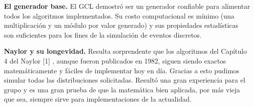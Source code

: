 \documentclass[a4paper, 11pt]{article}
\begin{document}
\textbf{El generador base.} El GCL demostró ser un generador confiable para
alimentar todos los algoritmos implementados. Su costo computacional es mínimo (una
multiplicación y un módulo por valor generado) y sus propiedades estadísticas son
suficientes para los fines de la simulación de eventos discretos.

\textbf{Naylor y su longevidad.} Resulta sorprendente que los algoritmos del Capítulo 4 del Naylor
[1] , aunque fueron publicados en 1982, siguen siendo exactos matemáticamente y fáciles de
implementar hoy en día. Gracias a esto pudimos simular todas las distribuciones solicitadas.
Resultó una gran experiencia para el grupo y es una gran prueba de que la matemática bien
aplicada, por más vieja que sea, siempre sirve para implementaciones de la actualidad.

\newpage
\nocite{*}


\end{document}
